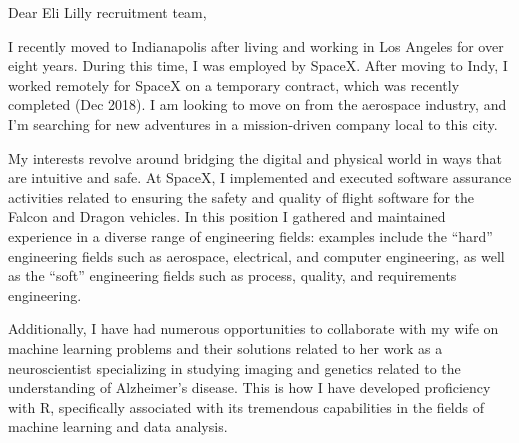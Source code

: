 \begin{cvletter}


Dear Eli Lilly recruitment team,

I recently moved to Indianapolis after living and working in Los Angeles for over eight
years. During this time, I was employed by SpaceX. After moving to Indy, I worked remotely for
SpaceX on a temporary contract, which was recently completed (Dec 2018). I am looking to move on
from the aerospace industry, and I'm searching for new adventures in a mission-driven company local
to this city.

My interests revolve around bridging the digital and physical world in ways that are intuitive and
safe. At SpaceX, I implemented and executed software assurance activities related to ensuring the
safety and quality of flight software for the Falcon and Dragon vehicles. In this position I
gathered and maintained experience in a diverse range of engineering fields: examples include the
``hard'' engineering fields such as aerospace, electrical, and computer engineering, as well as the
``soft'' engineering fields such as process, quality, and requirements engineering.

Additionally, I have had numerous opportunities to collaborate with my wife on machine learning
problems and their solutions related to her work as a neuroscientist specializing in studying
imaging and genetics related to the understanding of Alzheimer's disease. This is how I have
developed proficiency with R, specifically associated with its tremendous capabilities in the fields
of machine learning and data analysis.







\end{cvletter}

